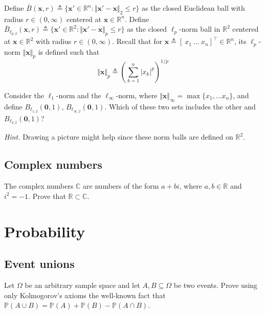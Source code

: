 \documentclass{article}
\numberwithin{equation}{section}
\begin{document}
Define $ \bar{B}(\mathbf{x}, r) \triangleq \{\mathbf{x}' \in \mathbb{R}^n :
\Vert\mathbf{x}' - \mathbf{x}\Vert_2 \le r\} $ as the closed Euclidean ball
with radius $ r \in (0, \infty) $ centered at $ \mathbf{x} \in \mathbb{R}^n $.
Define $ \bar{B}_{\ell_{p, 2}}(\mathbf{x}, r) \triangleq \{\mathbf{x}' \in
\mathbb{R}^2 : \Vert\mathbf{x}' - \mathbf{x}\Vert_p \le r\} $ as the closed
$ \ell_p $-norm ball in $ \mathbb{R}^2 $ centered at $ \mathbf{x}
\in \mathbb{R}^2 $ with radius $ r \in (0, \infty) $. Recall that for
$ \mathbf{x} \triangleq [ \ x_1 \ \ldots \ x_n ]^\top \in \mathbb{R}^n $, its
$ \ell_p $-norm $ \Vert\mathbf{x}\Vert_p $ is defined such that
\begin{equation*}
    \Vert\mathbf{x}\Vert_p \triangleq
    \left(\sum_{k = 1}^n|x_k|^p\right)^{1 / p}
\end{equation*}

Consider the $ \ell_1 $-norm and the $ \ell_\infty $-norm, where
$ \Vert\mathbf{x}\Vert_\infty = \max\{x_1, \ldots x_n\} $, and define
$ B_{\ell_{1, 2}}(\mathbf{0}, 1) $, $ B_{\ell_{\infty, 2}}(\mathbf{0}, 1) $.
Which of these two sets includes the other and
$ B_{\ell_{2, 2}}(\mathbf{0}, 1) $?

\medskip

\textit{Hint.} Drawing a picture might help since these norm balls are
defined on $ \mathbb{R}^2 $.

\subsection{Complex numbers}

The complex numbers $ \mathbb{C} $ are numbers of the form $ a + bi $, where
$ a, b \in \mathbb{R} $ and $ i^2 = -1 $. Prove that
$ \mathbb{R} \subset \mathbb{C} $.

\section{Probability}

\subsection{Event unions}

Let $ \Omega $ be an arbitrary sample space and let $ A, B \subseteq \Omega $
be two events. Prove using only Kolmogorov's axioms the well-known fact that
$ \mathbb{P}(A \cup B) = \mathbb{P}(A) + \mathbb{P}(B) -
\mathbb{P}(A \cap B) $.

\medskip
\end{document}
